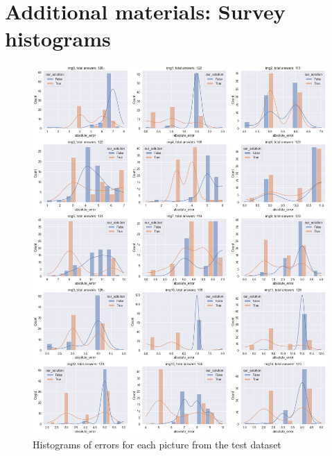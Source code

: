 \section{Additional materials: Survey histograms}

\begin{figure}[h!]
    \label{survey:separate}
    \centering
    \includegraphics[width=\linewidth]{figures/survey_separate.png}
    \caption{Histograms of errors for each picture from the test dataset}
\end{figure}